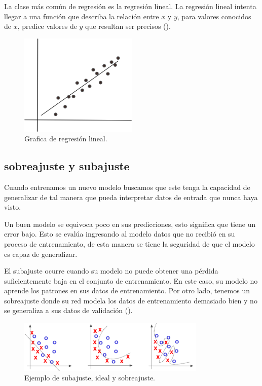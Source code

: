 La clase más común de regresión es la regresión lineal. La regresión lineal intenta llegar a una función que describa la relación entre $x$ y $y$, para valores conocidos de $x$, predice valores de $y$ que resultan ser precisos (\cite{patterson2017deep}).

\begin{figure}[H]
    \centering
    \includegraphics[width=0.5\textwidth]{MarcoTeorico/imgs/RegresionLineal.png}
    \caption{Grafica de regresión lineal.}
    \label{fig:regresionLineal}
\end{figure}

\subsection{sobreajuste y subajuste}

Cuando entrenamos un nuevo modelo buscamos que este tenga la capacidad de generalizar de tal manera que pueda interpretar datos de entrada que nunca haya visto.

Un buen modelo se equivoca poco en sus predicciones, esto significa que tiene un error bajo. Esto se evalúa ingresando al modelo datos que no recibió en su proceso de entrenamiento, de esta manera se tiene la seguridad de que el modelo es capaz de generalizar.

El subajuste ocurre cuando su modelo no puede obtener una pérdida suficientemente baja en el conjunto de entrenamiento. En este caso, su modelo no aprende los patrones en sus datos de entrenamiento. Por otro lado, tenemos un sobreajuste donde su red modela los datos de entrenamiento demasiado bien y no se generaliza a sus datos de validación (\cite{rosebrock2017deep}).


\begin{figure}[H]
    \centering
    \includegraphics[width=0.8\textwidth]{MarcoTeorico/imgs/under-overfitting.png}
    \caption{Ejemplo de subajuste, ideal y sobreajuste.}
    \label{fig:underOverFtting}
\end{figure}
